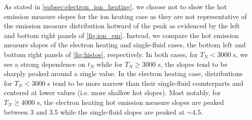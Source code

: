 \documentclass[apj]{emulateapj}
\begin{document}
	\par As stated in \autoref{subsec:electron_ion_heating}, we choose not to show the hot emission measure slopes for the ion heating case as they are not representative of the emission measure distribution hotward of the peak as evidenced by the left and bottom right panels of \autoref{fig:ion_em}. Instead, we compare the hot emission measure slopes of the electron heating and single-fluid cases, the bottom left and bottom right panels of \autoref{fig:histos}, respectively. In both cases, for $T_N<3000$ s, we see a strong dependence on $t_N$ while for $T_N\ge3000$ s, the slopes tend to be sharply peaked around a single value. In the electron heating case, distributions for $T_N<3000$ s tend to be more narrow than their single-fluid counterparts and centered at lower values (i.e. more shallow hot slopes). Most notably, for $T_N\ge4000$ s, the electron heating hot emission measure slopes are peaked between 3 and 3.5 while the single-fluid slopes are peaked at $\sim4.5$. 
\end{document}
